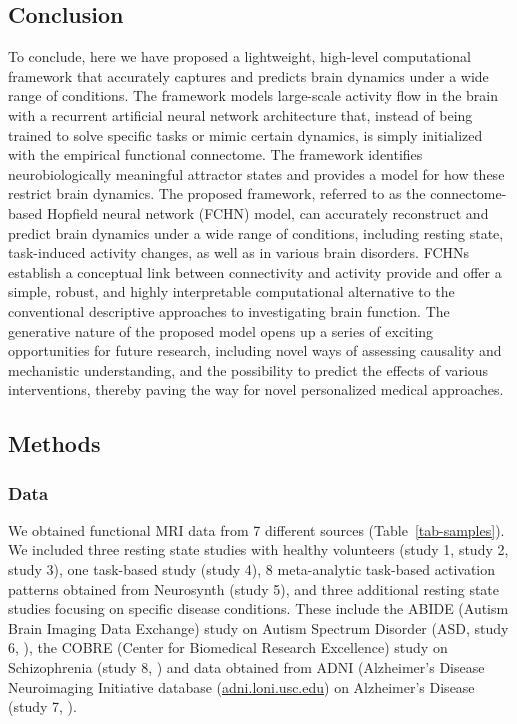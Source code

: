 \documentclass{article}
\begin{document}
\subsection{Conclusion}\label{Conclusion}

To conclude, here we have proposed a lightweight, high-level computational framework that accurately captures and predicts brain dynamics under a wide range of conditions. The framework models large-scale activity flow in the brain with a recurrent artificial neural network architecture that, instead of being trained to solve specific tasks or mimic certain dynamics, is simply initialized with the empirical functional connectome. The framework identifies neurobiologically meaningful attractor states and provides a model for how these restrict brain dynamics. The proposed framework, referred to as the connectome-based Hopfield neural network (FCHN) model, can accurately reconstruct and predict brain dynamics under a wide range of conditions, including resting state, task-induced activity changes, as well as in various brain disorders. FCHNs establish a conceptual link between connectivity and activity provide and offer a simple, robust, and highly interpretable computational alternative to the conventional descriptive approaches to investigating brain function. The generative nature of the proposed model opens up a series of exciting opportunities for future research, including novel ways of assessing causality and mechanistic understanding, and the possibility to predict the effects of various interventions, thereby paving the way for novel personalized medical approaches.

\subsection{Methods}\label{Methods}

\subsubsection{Data}\label{Data}

We obtained functional MRI data from 7 different sources (Table~\ref{tab-samples}).
We included three resting state studies with healthy volunteers (study 1, study 2, study 3), one task-based study (study 4), 8 meta-analytic task-based activation patterns obtained from Neurosynth (study 5), and three additional resting state studies focusing on specific disease conditions. These include the ABIDE (Autism Brain Imaging Data Exchange) study on Autism Spectrum Disorder (ASD, study 6, \cite{di2014autism}), the COBRE (Center for Biomedical Research Excellence) study on Schizophrenia (study 8, \citep{aine2017multimodal}) and data obtained from ADNI (Alzheimer's Disease Neuroimaging Initiative database (\href{http://adni.loni.usc.edu}{adni.loni.usc.edu}) on Alzheimer's Disease (study 7, \citep{petersen2010alzheimer}).
\end{document}
